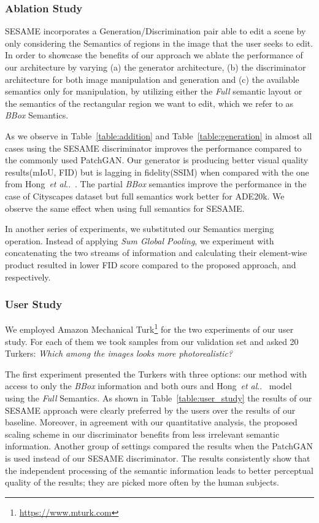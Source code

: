 \documentclass[runningheads]{llncs}
\makeatletter
\DeclareRobustCommand\onedot{\futurelet\@let@token\@onedot}
\def\@onedot{\ifx\@let@token.\else.\null\fi\xspace}
\def\etal{\emph{et al}\onedot}
\def\hong{Hong~\etal~\cite{hong2018learning}}
\newcommand{\tref}[1]{Table~\ref{#1}}
\makeatother
\begin{document}
\subsubsection{Ablation Study}
\label{ssc:ablation_study}


SESAME incorporates a Generation/Discrimination pair able to edit a scene by only considering the Semantics of regions in the image that the user seeks to edit. In order to showcase the benefits of our approach we ablate the performance of our architecture by varying (a) the generator architecture, (b) the discriminator architecture for both image manipulation and generation and (c) the available semantics only for manipulation, by utilizing either the \emph{Full} semantic layout or the semantics of the rectangular region we want to edit, which we refer to as \emph{BBox} Semantics. 

As we observe in \tref{table:addition} and \tref{table:generation} in almost all cases using the SESAME discriminator improves the performance compared to the commonly used PatchGAN. Our generator is producing better visual quality results(mIoU, FID) but is lagging in fidelity(SSIM) when compared with the one from \hong{}. The partial \emph{BBox} semantics improve the performance in the case of Cityscapes dataset but full semantics work better for ADE20k. We observe the same effect when using full semantics for SESAME. 

In another series of experiments, we substituted our Semantics merging operation. Instead of applying \textit{Sum Global Pooling}, we experiment with  concatenating the two streams of information and  calculating their element-wise product resulted in lower FID score compared to the proposed approach,  and  respectively.

\subsubsection{User Study}
\label{ssc:user_study}

We employed Amazon Mechanical Turk\footnote{\url{https://www.mturk.com}} for the two experiments of our user study.
For each of them we took  samples from our validation set and asked 20 Turkers: \textit{Which among the images looks more photorealistic?}

The first experiment presented the Turkers with three options: our method with access to only the \textit{BBox} information and both ours and \hong{} model using the \textit{Full} Semantics. 
As shown in Table~\ref{table:user_study} the results of our SESAME approach were clearly preferred by the users over the results of our baseline. Moreover, in agreement with our quantitative analysis, the proposed scaling scheme in our discriminator benefits from less irrelevant semantic information.
Another group of settings compared the results when the PatchGAN is used instead of our SESAME discriminator. The results consistently show that the independent processing of the semantic information leads to better perceptual quality of the results; they are picked more often by the human subjects.
\end{document}
